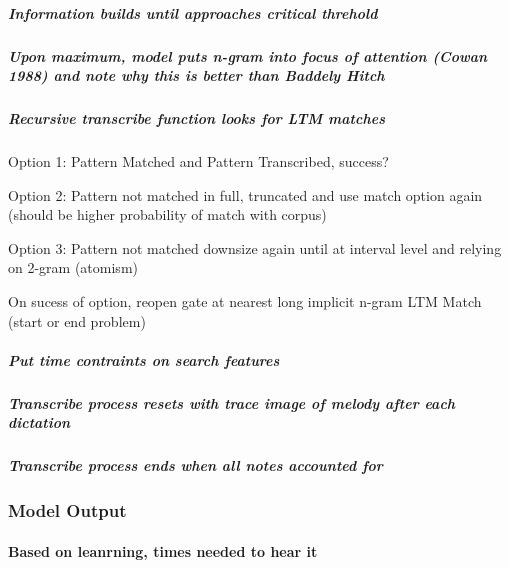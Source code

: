 \documentclass[]{book}
\let\oldparagraph\paragraph
\renewcommand{\paragraph}[1]{\oldparagraph{#1}\mbox{}}
\let\oldsubparagraph\subparagraph
\renewcommand{\subparagraph}[1]{\oldsubparagraph{#1}\mbox{}}
\theoremstyle{definition}
\theoremstyle{definition}
\theoremstyle{definition}
\theoremstyle{remark}
\begin{document}
\hypertarget{information-builds-until-approaches-critical-threhold}{%
\subparagraph{Information builds until approaches critical
threhold}\label{information-builds-until-approaches-critical-threhold}}

\hypertarget{upon-maximum-model-puts-n-gram-into-focus-of-attention-cowan-1988-and-note-why-this-is-better-than-baddely-hitch}{%
\subparagraph{Upon maximum, model puts n-gram into focus of attention
(Cowan 1988) and note why this is better than Baddely
Hitch}\label{upon-maximum-model-puts-n-gram-into-focus-of-attention-cowan-1988-and-note-why-this-is-better-than-baddely-hitch}}

\hypertarget{recursive-transcribe-function-looks-for-ltm-matches}{%
\subparagraph{Recursive transcribe function looks for LTM
matches}\label{recursive-transcribe-function-looks-for-ltm-matches}}

Option 1: Pattern Matched and Pattern Transcribed, success?

Option 2: Pattern not matched in full, truncated and use match option
again (should be higher probability of match with corpus)

Option 3: Pattern not matched downsize again until at interval level and
relying on 2-gram (atomism)

On sucess of option, reopen gate at nearest long implicit n-gram LTM
Match (start or end problem)

\hypertarget{put-time-contraints-on-search-features}{%
\subparagraph{Put time contraints on search
features}\label{put-time-contraints-on-search-features}}

\hypertarget{transcribe-process-resets-with-trace-image-of-melody-after-each-dictation}{%
\subparagraph{Transcribe process resets with trace image of melody after
each
dictation}\label{transcribe-process-resets-with-trace-image-of-melody-after-each-dictation}}

\hypertarget{transcribe-process-ends-when-all-notes-accounted-for}{%
\subparagraph{Transcribe process ends when all notes accounted
for}\label{transcribe-process-ends-when-all-notes-accounted-for}}

\hypertarget{model-output}{%
\subsubsection{Model Output}\label{model-output}}

\hypertarget{based-on-leanrning-times-needed-to-hear-it}{%
\paragraph{Based on leanrning, times needed to hear
it}\label{based-on-leanrning-times-needed-to-hear-it}}
\end{document}
